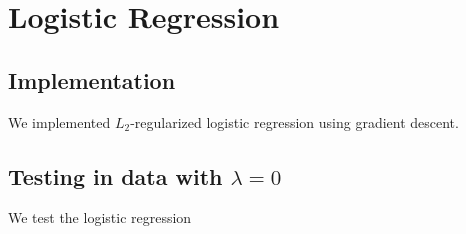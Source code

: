 
\section{Logistic Regression}\label{sec:lr}

\subsection{Implementation}
We implemented $L_2$-regularized logistic regression using gradient descent.

\subsection{Testing in data with $\lambda = 0$}
We test the logistic regression 

